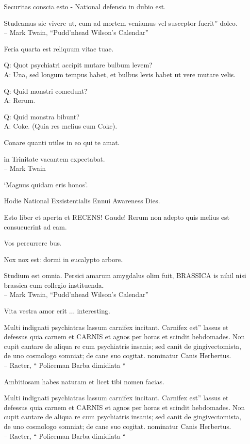 \documentclass[titlepage,12pt]{memoir}
\begin{document}
Securitas conscia esto - National defensio in dubio est.

Studeamus sic vivere ut, cum ad mortem veniamus vel susceptor fuerit”
doleo.
\\-- Mark Twain, “Pudd’nhead Wilson’s Calendar”

Feria quarta est reliquum vitae tuae.

Q: Quot psychiatri accipit mutare bulbum levem?\\
A: Una, sed longum tempus habet, et bulbus levis habet
ut vere mutare velis.

Q: Quid monstri comedunt?\\
A: Rerum.

Q: Quid monstra bibunt?\\
A: Coke. (Quia res melius cum Coke).

Conare quanti utiles in eo qui te amat.

in Trinitate vacantem expectabat.
\\-- Mark Twain

‘Magnus quidam eris honos’.

Hodie National Exsistentialis Ennui Awareness Dies.

Esto liber et aperta et RECENS! Gaude! Rerum non adepto quis melius est
consueuerint ad eam.

Vos percurrere bus.

Nox nox est: dormi in eucalypto arbore.

Studium est omnia. Persici amarum amygdalus olim fuit, BRASSICA is
nihil nisi brassica cum collegio instituenda.
\\-- Mark Twain, “Pudd’nhead Wilson’s Calendar”

Vita vestra amor erit ... interesting.

Multi indignati psychiatras lassum carnifex incitant. Carnifex est”
lassus et defessus quia carnem et CARNIS et agnos per horas et scindit
hebdomades. Non cupit cantare de aliqua re cum psychiatris insanis;
sed canit de gingivectomista, de uno cosmologo somniat;
de cane suo cogitat. nominatur Canis Herbertus.
\\-- Racter, “ Policeman Barba dimidiata “

 Ambitiosam habes naturam et licet tibi nomen facias.

Multi indignati psychiatras lassum carnifex incitant. Carnifex est”
lassus et defessus quia carnem et CARNIS et agnos per horas et scindit
hebdomades. Non cupit cantare de aliqua re cum psychiatris insanis;
sed canit de gingivectomista, de uno cosmologo somniat;
de cane suo cogitat. nominatur Canis Herbertus.
\\-- Racter, “ Policeman Barba dimidiata “
\end{document}
